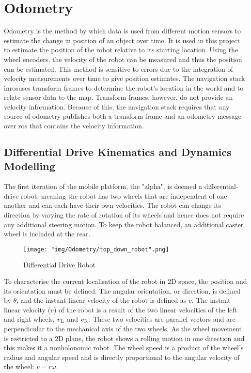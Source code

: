 \newpage
\chapter{Odometry}

Odometry is the method by which data is used from different motion sensors to estimate the change in position of an object over time. It is used in this project to estimate the position of the robot relative to its starting location. Using the wheel encoders, the velocity of the robot can be measured and thus the position can be estimated. This method is sensitive to errors due to the integration of velocity measurements over time to give position estimates.
The navigation stack in\gls{ros}uses transform frames to determine the robot's location in the world and to relate sensor data to the map. Transform frames, however, do not provide an velocity information. Because of this, the navigation stack requires that any source of odometry publishes both a transform frame and an odometry message over \gls{ros} that contains the velocity information.

\section{Differential Drive Kinematics and Dynamics Modelling}

The first iteration of the mobile platform, the "alpha", is deemed a differential-drive robot, meaning the robot has two wheels that are independent of one another and can each have their own velocities. The robot can change its direction by varying the rate of rotation of its wheels and hence does not require any additional steering motion. To keep the robot balanced, an additional caster wheel is included at the rear.

\begin{figure}[htbp]
    \centering
    \texttt{[image: "img/Odometry/top\_down\_robot".png]} 
    \caption{Differential Drive Robot}
    \label{fig:diffdriverobotfig}
\end{figure}

To characterise the current localisation of the robot in 2D space, the position and its orientation must be defined. The angular orientation, or direction, is defined by $\theta$, and the instant linear velocity of the robot is defined as $v$. The instant linear velocity ($v$) of the robot is a result of the two linear velocities of the left and right wheels, $v\textsubscript{L}$ and $v\textsubscript{R}$. These two velocities are parallel vectors and are perpendicular to the mechanical axis of the two wheels. As the wheel movement is restricted to a 2D plane, the robot shows a rolling motion in one direction and this makes it a nonholonomic robot. The wheel speed is a product of the wheel's radius and angular speed and is directly proportional to the angular velocity of the wheel: $v = r\omega$.

